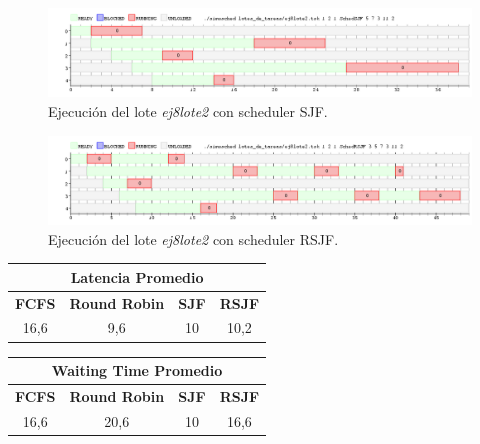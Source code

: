 \begin{figure}[!h]
	\begin{center}
		\includegraphics[width=500px]{imagenes/ej8_prueba2_sjf.png}
		\caption{Ejecución del lote \emph{ej8lote2} con scheduler SJF.}
		\label{fig:grafico_ej8_prueba2_sjf}
	\end{center}
\end{figure}

\newpage

\begin{figure}[!h]
	\begin{center}
		\includegraphics[width=500px]{imagenes/ej8_prueba2_rsjf.png}
		\caption{Ejecución del lote \emph{ej8lote2} con scheduler RSJF.}
		\label{fig:grafico_ej8_prueba2_rsjf}
	\end{center}
\end{figure}

\begin{center}
	\begin{tabular}{|c|c|c|c|}
		\hline
		\multicolumn{4}{|c|}{\large{\textbf{Latencia Promedio}}} \\
		\hline
		\textbf{FCFS} & \textbf{Round Robin} & \textbf{SJF} & \textbf{RSJF} \\
		\hline
		16,6 & 9,6 & 10 & 10,2 \\
		\hline
	\end{tabular}
\end{center}

\begin{center}
	\begin{tabular}{|c|c|c|c|}
		\hline
		\multicolumn{4}{|c|}{\large{\textbf{Waiting Time Promedio}}} \\
		\hline
		\textbf{FCFS} & \textbf{Round Robin} & \textbf{SJF} & \textbf{RSJF} \\
		\hline
		16,6 & 20,6 & 10 & 16,6 \\
		\hline
	\end{tabular}
\end{center}

